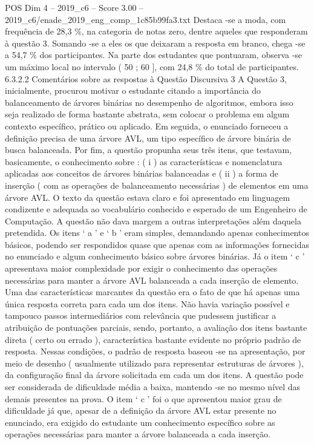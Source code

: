 \begin{textsample}{POS Dim 4 – 2019\_c6 – Score 3.00 – 2019\_c6/enade\_2019\_eng\_comp\_1c85b99fa3.txt}
Destaca -se a moda, com frequência de 28,3 \%, na categoria de notas zero, dentre aqueles que responderam à questão 3.
Somando -se a eles os que deixaram a resposta em branco, chega -se a 54,7 \% dos participantes.
Na parte dos estudantes que pontuaram, observa -se um máximo local no intervalo ( 50 ; 60 ], com 24,8 \% do total de participantes. 6.3.2.2 Comentários sobre as respostas à Questão Discursiva 3 A Questão 3, inicialmente, procurou motivar o estudante citando a importância do balanceamento de árvores binárias no desempenho de algoritmos, embora isso seja realizado de forma bastante abstrata, sem colocar o problema em algum contexto específico, prático ou aplicado.
Em seguida, o enunciado forneceu a definição precisa de uma árvore AVL, um tipo específico de árvore binária de busca balanceada.
Por fim, a questão propunha seus três itens, que testavam, basicamente, o conhecimento sobre : ( i ) as características e nomenclatura aplicadas aos conceitos de árvores binárias balanceadas e ( ii ) a forma de inserção ( com as operações de balanceamento necessárias ) de elementos em uma árvore AVL.
O texto da questão estava claro e foi apresentado em linguagem condizente e adequada ao vocabulário conhecido e esperado de um Engenheiro de Computação.
A questão não dava margem a outras interpretações além daquela pretendida.
Os itens ‘ a ’ e ‘ b ’ eram simples, demandando apenas conhecimentos básicos, podendo ser respondidos quase que apenas com as informações fornecidas no enunciado e algum conhecimento básico sobre árvores binárias.
Já o item ‘ c ’ apresentava maior complexidade por exigir o conhecimento das operações necessárias para manter a árvore AVL balanceada a cada inserção de elemento.
Uma das características marcantes da questão era o fato de que há apenas uma única resposta correta para cada um dos itens.
Não havia variação possível e tampouco passos intermediários com relevância que pudessem justificar a atribuição de pontuações parciais, sendo, portanto, a avaliação dos itens bastante direta ( certo ou errado ), característica bastante evidente no próprio padrão de resposta.
Nessas condições, o padrão de resposta baseou -se na apresentação, por meio de desenho ( usualmente utilizado para representar estruturas de árvores ), da configuração final da árvore solicitada em cada um dos itens.
A questão pode ser considerada de dificuldade média a baixa, mantendo -se no mesmo nível das demais presentes na prova.
O item ‘ c ’ foi o que apresentou maior grau de dificuldade já que, apesar de a definição da árvore AVL estar presente no enunciado, era exigido do estudante um conhecimento específico sobre as operações necessárias para manter a árvore balanceada a cada inserção.

\end{textsample}
